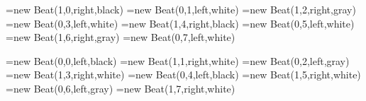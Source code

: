 
\pgfoonew \RightA=new Beat(1,0,right,black)
\pgfoonew \RightB=new Beat(0,1,left,white)
\pgfoonew \RightC=new Beat(1,2,right,gray)
\pgfoonew \RightD=new Beat(0,3,left,white)
\pgfoonew \RightE=new Beat(1,4,right,black)
\pgfoonew \RightF=new Beat(0,5,left,white)
\pgfoonew \RightG=new Beat(1,6,right,gray)
\pgfoonew \RightH=new Beat(0,7,left,white)

\pgfoonew \LeftA=new Beat(0,0,left,black)
\pgfoonew \LeftB=new Beat(1,1,right,white)
\pgfoonew \LeftC=new Beat(0,2,left,gray)
\pgfoonew \LeftD=new Beat(1,3,right,white)
\pgfoonew \LeftE=new Beat(0,4,left,black)
\pgfoonew \LeftF=new Beat(1,5,right,white)
\pgfoonew \LeftG=new Beat(0,6,left,gray)
\pgfoonew \LeftH=new Beat(1,7,right,white)

